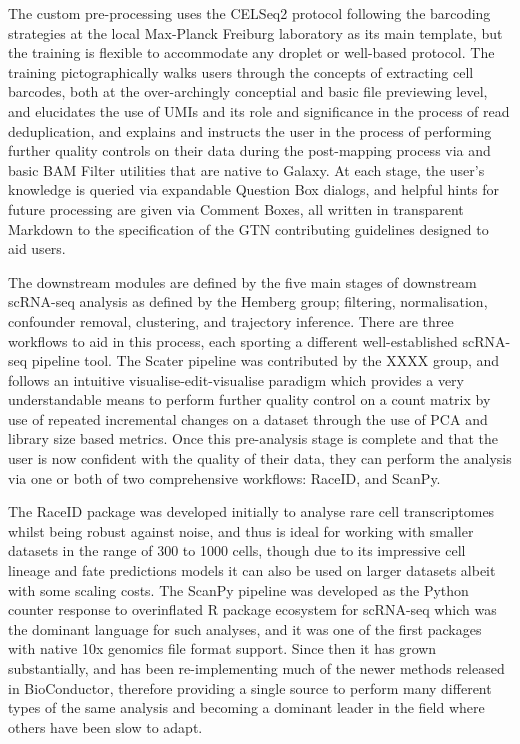 \documentclass[a4paper,num-refs]{oup-contemporary}
\begin{document}
The custom pre-processing uses the CELSeq2 protocol following the barcoding strategies at the local Max-Planck Freiburg laboratory as its main template, but the training is flexible to accommodate any droplet or well-based protocol. The training pictographically walks users through the concepts of extracting cell barcodes, both at the over-archingly conceptial and basic file previewing level, and elucidates the use of UMIs and its role and significance in the process of read deduplication, and explains and instructs the user in the process of performing further quality controls on their data during the post-mapping process via  and basic BAM Filter utilities that are native to Galaxy. At each stage, the user's knowledge is queried via expandable Question Box dialogs, and helpful hints for future processing are given via Comment Boxes, all written in transparent Markdown to the specification of the GTN contributing guidelines designed to aid users.

The downstream modules are defined by the five main stages of downstream scRNA-seq analysis as defined by the Hemberg group; filtering, normalisation, confounder removal, clustering, and trajectory inference. There are three workflows to aid in this process, each sporting a different well-established scRNA-seq pipeline tool. The Scater pipeline was contributed by the XXXX group, and follows an intuitive visualise-edit-visualise paradigm which provides a very understandable means to perform further quality control on a count matrix by use of repeated incremental changes on a dataset through the use of PCA and library size based metrics. Once this pre-analysis stage is complete and that the user is now confident with the quality of their data, they can perform the analysis via one or both of two comprehensive workflows: RaceID, and ScanPy.

The RaceID package was developed initially to analyse rare cell transcriptomes whilst being robust against noise, and thus is ideal for working with smaller datasets in the range of 300 to 1000 cells, though due to its impressive cell lineage and fate predictions models it can also be used on larger datasets albeit with some scaling costs. The ScanPy pipeline was developed as the Python counter response to overinflated R package ecosystem for scRNA-seq which was the dominant language for such analyses, and it was one of the first packages with native 10x genomics file format support. Since then it has grown substantially, and has been re-implementing much of the newer methods released in BioConductor, therefore providing a single source to perform many different types of the same analysis and becoming a dominant leader in the field where others have been slow to adapt.
\end{document}
